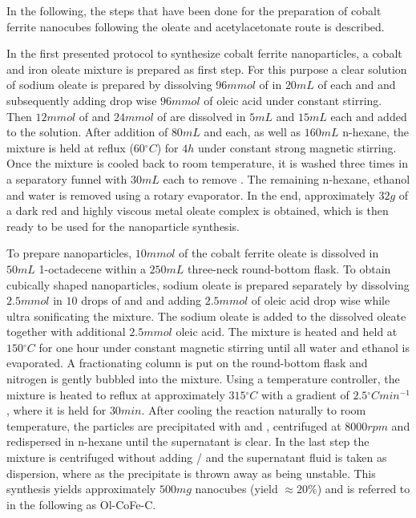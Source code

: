 \documentclass[\main/dresen_thesis.tex]{subfiles}
\begin{document}
  \label{sec:monolayers:nanoparticle:synthesisOleatesAcAc}
  In the following, the steps that have been done for the preparation of cobalt ferrite nanocubes following the oleate and acetylacetonate route is described.

    In the first presented protocol to synthesize cobalt ferrite nanoparticles, a cobalt and iron oleate mixture is prepared as first step.
    For this purpose a clear solution of sodium oleate is prepared by dissolving $96 \unit{mmol}$ of  in $20 \unit{mL}$ of each  and  and subsequently adding drop wise $96 \unit{mmol}$ of oleic acid under constant stirring.
    Then $12 \unit{mmol}$ of  and $24 \unit{mmol}$ of  are dissolved in $5 \unit{mL}$  and $15 \unit{mL}$  each and added to the solution.
    After addition of $80 \unit{mL}$  and  each, as well as $160 \unit{mL}$ n-hexane, the mixture is held at reflux ($60 \unit{^\circ C}$) for $4 \unit{h}$ under constant strong magnetic stirring.
    Once the mixture is cooled back to room temperature, it is washed three times in a separatory funnel with $30 \unit{mL}$  each to remove .
    The remaining n-hexane, ethanol and water is removed using a rotary evaporator.
    In the end, approximately $32 \unit{g}$ of a dark red and highly viscous metal oleate complex is obtained, which is then ready to be used for the nanoparticle synthesis.

    To prepare nanoparticles, $10 \unit{mmol}$ of the cobalt ferrite oleate is dissolved in $50 \unit{mL}$ 1-octadecene within a $250 \unit{mL}$ three-neck round-bottom flask.
    To obtain cubically shaped nanoparticles, sodium oleate is prepared separately by dissolving $2.5 \unit{mmol}$  in $10$ drops of  and  and adding $2.5 \unit{mmol}$ of oleic acid drop wise while ultra sonificating the mixture.
    The sodium oleate is added to the dissolved oleate together with additional $2.5 \unit{mmol}$ oleic acid.
    The mixture is heated and held at $150 \unit{^\circ C}$ for one hour under constant magnetic stirring until all water and ethanol is evaporated.
    A fractionating column is put on the round-bottom flask and nitrogen is gently bubbled into the mixture.
    Using a temperature controller, the mixture is heated to reflux at approximately $315 \unit{^\circ C}$ with a gradient of $2.5 \unit{^\circ C min^{-1}}$, where it is held for $30 \unit{min}$.
    After cooling the reaction naturally to room temperature, the particles are precipitated with  and , centrifuged at $8000 \unit{rpm}$ and redispersed in n-hexane until the supernatant is clear.
    In the last step the mixture is centrifuged without adding / and the supernatant fluid is taken as dispersion, where as the precipitate is thrown away as being unstable.
    This synthesis yields approximately $500 \unit{mg}$ nanocubes (yield $\approx 20 \%$) and is referred to in the following as Ol-CoFe-C.
\end{document}
